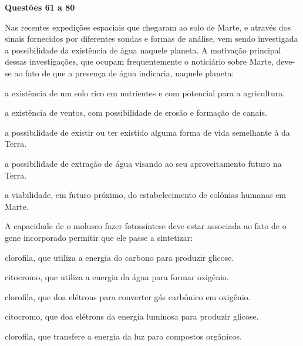 
\noindent\textbf{Questões 61 a 80} %

%
%

\questao
Nas recentes expedições espaciais que chegaram ao solo de Marte, e através dos sinais fornecidos por diferentes sondas e formas de análise, vem sendo investigada a possibilidade da existência de água naquele planeta. A motivação principal dessas investigações, que ocupam frequentemente o noticiário sobre Marte, deve-se ao fato de que a presença de água indicaria, naquele planeta:
\begin{alternativas}
\item a existência de um solo rico em nutrientes e com potencial para a agricultura. 
\item a existência de ventos, com possibilidade de erosão e formação de canais. 
\item a possibilidade de existir ou ter existido alguma forma de vida semelhante à da Terra. 
\item a possibilidade de extração de água visando ao seu aproveitamento futuro na Terra. 
\item a viabilidade, em futuro próximo, do estabelecimento de colônias humanas em Marte.
\end{alternativas}

\questao
{}
A capacidade de o molusco fazer fotossíntese deve estar associada ao fato de o gene incorporado permitir que ele passe a sintetizar:
\begin{alternativas}
\item clorofila, que utiliza a energia do carbono para produzir glicose. 
\item citocromo, que utiliza a energia da água para formar oxigênio. 
\item clorofila, que doa elétrons para converter gás carbônico em oxigênio. 
\item citocromo, que doa elétrons da energia luminosa para produzir glicose. 
\item clorofila, que transfere a energia da luz para compostos orgânicos.
\end{alternativas}

